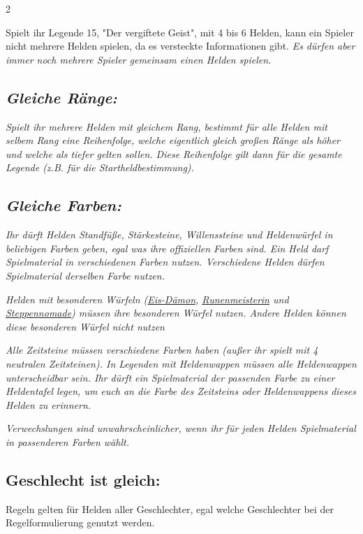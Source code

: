 \documentclass[10pt, a4paper, oneside]{book}
\newcommand{\fan}[1]{\textit{#1}}
\begin{document}
\begin{multicols*}{2}
\begin{nobgcolor}
\bullet{} Spielt ihr Legende 15, "Der vergiftete Geist", mit 4 bis 6 Helden, kann ein Spieler nicht mehrere Helden spielen, da es versteckte Informationen gibt. \fan{Es dürfen aber immer noch mehrere Spieler gemeinsam einen Helden spielen.}



\subsection{\fan{Gleiche Ränge:}}

\fan{Spielt ihr mehrere Helden mit gleichem Rang, bestimmt für alle Helden mit selbem Rang eine Reihenfolge, welche eigentlich gleich großen Ränge als höher und welche als tiefer gelten sollen. Diese Reihenfolge gilt dann für die gesamte Legende (z.B. für die Startheldbestimmung).}


\subsection{\fan{Gleiche Farben:}}

\fan{Ihr dürft Helden Standfüße, Stärkesteine, Willenssteine und Heldenwürfel in beliebigen Farben geben, egal was ihre offiziellen Farben sind. Ein Held darf Spielmaterial in verschiedenen Farben nutzen. Verschiedene Helden dürfen Spielmaterial derselben Farbe nutzen.} 

\fan{Helden mit besonderen Würfeln (\hyperref[eis-daemon]{Eis-Dämon},  \hyperref[runenmeisterin]{Runenmeisterin} und \hyperref[steppennomade]{Steppennomade}) müssen ihre besonderen Würfel nutzen. Andere Helden können diese besonderen Würfel nicht nutzen}

\fan{Alle Zeitsteine müssen verschiedene Farben haben (außer ihr spielt mit 4 neutralen Zeitsteinen). In Legenden mit Heldenwappen müssen alle Heldenwappen unterscheidbar sein. Ihr dürft ein Spielmaterial der passenden Farbe zu einer Heldentafel legen, um euch an die Farbe des Zeitsteins oder Heldenwappens dieses Helden zu erinnern.}


\fan{Verwechslungen sind unwahrscheinlicher, wenn ihr für jeden Helden Spielmaterial in passenderen Farben wählt.}




\subsection{Geschlecht ist gleich:}

Regeln gelten für Helden aller Geschlechter, egal welche Geschlechter bei der Regelformulierung genutzt werden.
\supercite{dlva-losspiel-anleitung,nh-begleitheft,dlh-losspiel-anleitung,dh-begleitheft,mh-begleitheft,dek-losspiel-anleitung,dfl-losspiel-anleitung}











\end{nobgcolor}
\end{multicols*}
\end{document}
